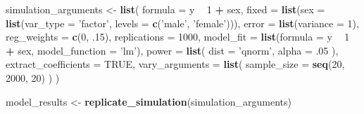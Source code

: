 \documentclass[man]{apa6}
\newenvironment{Shaded}{\begin{snugshade}}{\end{snugshade}}
\newcommand{\DataTypeTok}[1]{\textcolor[rgb]{0.13,0.29,0.53}{#1}}
\newcommand{\DecValTok}[1]{\textcolor[rgb]{0.00,0.00,0.81}{#1}}
\newcommand{\FloatTok}[1]{\textcolor[rgb]{0.00,0.00,0.81}{#1}}
\newcommand{\KeywordTok}[1]{\textcolor[rgb]{0.13,0.29,0.53}{\textbf{#1}}}
\newcommand{\NormalTok}[1]{#1}
\newcommand{\OperatorTok}[1]{\textcolor[rgb]{0.81,0.36,0.00}{\textbf{#1}}}
\newcommand{\OtherTok}[1]{\textcolor[rgb]{0.56,0.35,0.01}{#1}}
\newcommand{\StringTok}[1]{\textcolor[rgb]{0.31,0.60,0.02}{#1}}
\begin{document}
\begin{Shaded}
\begin{Highlighting}[]
\NormalTok{simulation_arguments <-}\StringTok{ }\KeywordTok{list}\NormalTok{(}
  \DataTypeTok{formula =}\NormalTok{ y }\OperatorTok{~}\StringTok{ }\DecValTok{1} \OperatorTok{+}\StringTok{ }\NormalTok{sex, }
  \DataTypeTok{fixed =} \KeywordTok{list}\NormalTok{(}\DataTypeTok{sex =} \KeywordTok{list}\NormalTok{(}\DataTypeTok{var_type =} \StringTok{'factor'}\NormalTok{, }
                            \DataTypeTok{levels =} \KeywordTok{c}\NormalTok{(}\StringTok{'male'}\NormalTok{, }\StringTok{'female'}\NormalTok{))),}
  \DataTypeTok{error =} \KeywordTok{list}\NormalTok{(}\DataTypeTok{variance =} \DecValTok{1}\NormalTok{),}
  \DataTypeTok{reg_weights =} \KeywordTok{c}\NormalTok{(}\DecValTok{0}\NormalTok{, }\FloatTok{.15}\NormalTok{),}
  \DataTypeTok{replications =} \DecValTok{1000}\NormalTok{,}
  \DataTypeTok{model_fit =} \KeywordTok{list}\NormalTok{(}\DataTypeTok{formula =}\NormalTok{ y }\OperatorTok{~}\StringTok{ }\DecValTok{1} \OperatorTok{+}\StringTok{ }\NormalTok{sex,}
                   \DataTypeTok{model_function =} \StringTok{'lm'}\NormalTok{),}
  \DataTypeTok{power =} \KeywordTok{list}\NormalTok{(}
    \DataTypeTok{dist =} \StringTok{'qnorm'}\NormalTok{,}
    \DataTypeTok{alpha =} \FloatTok{.05}
\NormalTok{  ),}
  \DataTypeTok{extract_coefficients =} \OtherTok{TRUE}\NormalTok{,}
  \DataTypeTok{vary_arguments =} \KeywordTok{list}\NormalTok{(}
    \DataTypeTok{sample_size =} \KeywordTok{seq}\NormalTok{(}\DecValTok{20}\NormalTok{, }\DecValTok{2000}\NormalTok{, }\DecValTok{20}\NormalTok{) }
\NormalTok{  )}
\NormalTok{)}

\NormalTok{model_results <-}\StringTok{ }\KeywordTok{replicate_simulation}\NormalTok{(simulation_arguments) }
\end{Highlighting}
\end{Shaded}

\begin{Shaded}
\end{Shaded}
\end{document}
